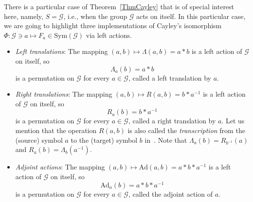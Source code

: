\documentclass{article}
\begin{document}
There is a particular case of Theorem~\ref{ThmCayley} that is of special
interest here, namely, $S=\mathcal{G}$, i.e., when the group $\mathcal{G}$
acts on itself. In this particular case, we are going to highlight three
implementations of Cayley's isomorphism $\Phi :\mathcal{G}\ni a\mapsto
F_{a}\in \mathrm{Sym}(\mathcal{G})$ via left actions.

\begin{itemize}
\item[\textbf{(A)}] \textit{Left translations}: The mapping $(a,b)\mapsto \Lambda
(a,b)=a\ast b$ is a left action of $\mathcal{G}$ on itself, so 
\begin{equation}
\Lambda _{a}(b)=a\ast b  \label{FreeAction}
\end{equation}%
is a permutation on $\mathcal{G}$ for every $a\in \mathcal{G}$, called a
left translation by $a$.

\item[\textbf{(B)}] \textit{Right translations}: The mapping $(a,b)\mapsto
R(a,b)=b\ast a^{-1}$ is a left action of $\mathcal{G}$ on itself, so%
\begin{equation}
R_{a}(b)=b\ast a^{-1}  \label{Transcript}
\end{equation}%
is a permutation on $\mathcal{G}$ for every $a\in \mathcal{G}$, called a
right translation by $a$. Let us mention that the operation $R(a,b)$ is also
called the \textit{transcription} from the (source) symbol $a$ to the
(target) symbol $b$ in~\cite{Monetti2009}. Note that $\Lambda
_{a}(b)=R_{b^{-1}}(a)$ and $R_{a}(b)=\Lambda _{b}(a^{-1})$.

\item[\textbf{(C)}] \textit{Adjoint actions}: The mapping $(a,b)\mapsto \mathrm{Ad}%
(a,b)=a\ast b\ast a^{-1}$ is a left action of $\mathcal{G}$ on itself, so%
\begin{equation}
\mathrm{Ad}_{a}(b)=a\ast b\ast a^{-1}  \label{Adjoint}
\end{equation}%
is a permutation on $\mathcal{G}$ for every $a\in \mathcal{G}$, called the
adjoint action of $a$.
\end{itemize}
\end{document}
